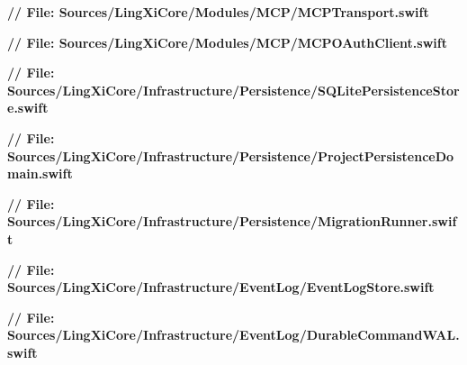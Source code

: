 \documentclass[10pt,a4paper]{article}
\newcommand{\repoRoot}{../../../}
\begin{document}
\noindent\textbf{// File: Sources/LingXiCore/Modules/MCP/MCPTransport.swift}\par\vspace{2pt}

\vspace{8pt}

\noindent\textbf{// File: Sources/LingXiCore/Modules/MCP/MCPOAuthClient.swift}\par\vspace{2pt}

\vspace{8pt}

\noindent\textbf{// File: Sources/LingXiCore/Infrastructure/Persistence/SQLitePersistenceStore.swift}\par\vspace{2pt}

\vspace{8pt}

\noindent\textbf{// File: Sources/LingXiCore/Infrastructure/Persistence/ProjectPersistenceDomain.swift}\par\vspace{2pt}

\vspace{8pt}

\noindent\textbf{// File: Sources/LingXiCore/Infrastructure/Persistence/MigrationRunner.swift}\par\vspace{2pt}

\vspace{8pt}

\noindent\textbf{// File: Sources/LingXiCore/Infrastructure/EventLog/EventLogStore.swift}\par\vspace{2pt}

\vspace{8pt}

\noindent\textbf{// File: Sources/LingXiCore/Infrastructure/EventLog/DurableCommandWAL.swift}\par\vspace{2pt}

\vspace{8pt}
\end{document}
